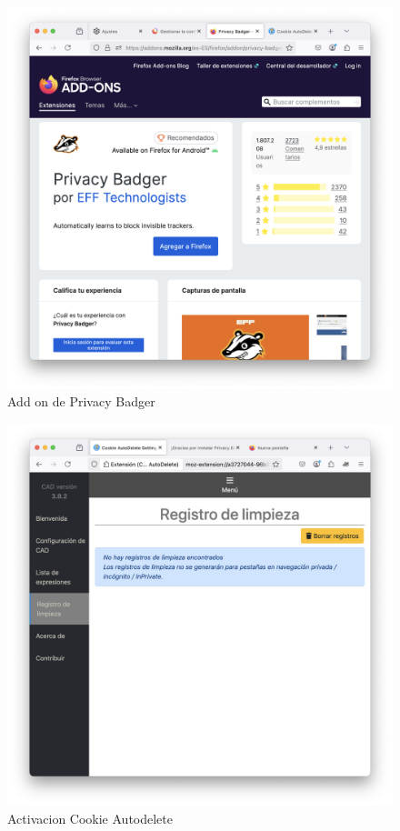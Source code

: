 \begin{figure}[H]   
    \includegraphics[width=\textwidth]{addon_privacybadger.png}
    \caption{Add on de Privacy Badger}
    \label{fig:addon_privacybadger}
\end{figure}

\begin{figure}[H]   
    \includegraphics[width=\textwidth]{activacion_cookie_autodelete.png}
    \caption{Activacion Cookie Autodelete}
    \label{fig:activacion_cookie_autodelete}
\end{figure}

